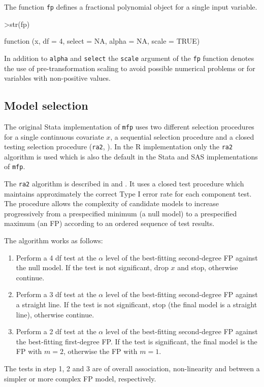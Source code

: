 \documentclass[11pt]{article}
\begin{document}
The function \texttt{fp} defines a fractional polynomial object for a single input 
variable. 

\begin{Schunk}
\begin{Sinput}
>str(fp)
\end{Sinput}
\begin{Soutput}
function (x, df = 4, select = NA, alpha = NA, scale = TRUE)  
\end{Soutput}
\end{Schunk}

In addition to \texttt{alpha} and \texttt{select} the \texttt{scale} argument of the 
\texttt{fp} function denotes the use of pre-transformation scaling to avoid possible 
numerical problems or for variables with non-positive values.

\subsection{Model selection}
The original Stata implementation of \texttt{mfp} uses two different selection procedures
for a single continuous covariate $x$, a sequential selection procedure and a closed 
testing selection procedure ({\tt ra2},  \cite{AmbRoy01} ).
In the R implementation only the {\tt ra2} algorithm is used which is also the default in the Stata and SAS implementations of \texttt{mfp}. 
 
The {\tt ra2} algorithm is described in \cite{AmbRoy01} and \cite{SauRoy02}. 
It uses a closed test procedure \cite{MarPerGab76} which maintains 
approximately the correct Type I error rate for each component test. 
The procedure allows the complexity of candidate models to increase progressively from a 
prespecified minimum (a null model) to a prespecified maximum (an FP) according to an 
ordered sequence of test results.

The algorithm works as follows:
\begin{enumerate}
\item Perform a 4 df test at the $\alpha$ level of the best-fitting second-degree FP against 
the null model. 
If the test is not significant, drop $x$ and stop, otherwise continue.
\item Perform a 3 df test at the $\alpha$ level of the best-fitting second-degree FP against 
a straight line. 
If the test is not significant, stop (the final model is a straight line), otherwise continue.
\item Perform a 2 df test at the $\alpha$ level of the best-fitting second-degree FP against 
the best-fitting first-degree FP. 
If the test is significant, the final model is the FP with $m=2$, otherwise the FP with $m=1$. 
\end{enumerate}
The tests in step 1, 2 and 3 are of overall association, non-linearity and between a simpler 
or more complex FP model, respectively.
\end{document}
